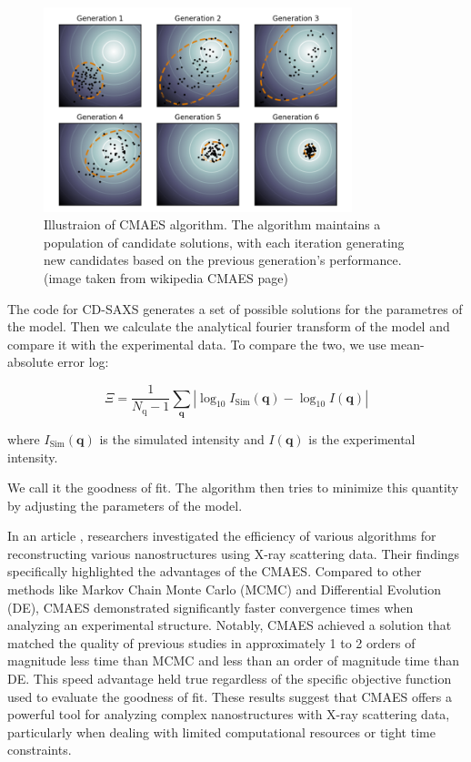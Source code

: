 \begin{figure}[h]
    \centering
    \includegraphics[width=0.8\textwidth]{images/CMAES.png}
    \caption{Illustraion of CMAES algorithm. The algorithm maintains a population of candidate solutions, with each iteration generating new candidates based on the previous generation's performance.(image taken from wikipedia CMAES page) }
    \label{fig:cmaes}
\end{figure}

\FloatBarrier

\medskip

The code for CD-SAXS generates a set of possible solutions for the parametres of the model. Then we calculate the 
analytical fourier transform of the model and compare it with the experimental data. To compare the two,
we use mean-absolute error log:

\medskip

\begin{equation}
    \Xi=\frac{1}{N_{\mathrm{q}}-1} \sum_{\mathbf{q}}\left|\log _{10} I_{\mathrm{Sim}}(\mathbf{q})-\log _{10} I(\mathbf{q})\right|
\end{equation}

\medskip

where $I_{\mathrm{Sim}}(\mathbf{q})$ is the simulated intensity and $I(\mathbf{q})$ is the experimental intensity.

\medskip

We call it the goodness of fit. The algorithm then tries to minimize this quantity by adjusting the parameters of the model.

\medskip

In an article \cite{hannon2016advancing}, researchers investigated the efficiency of various algorithms
for reconstructing various nanostructures using X-ray scattering data.
Their findings specifically highlighted the advantages of the CMAES. Compared to other
methods like Markov Chain Monte Carlo (MCMC) and Differential Evolution 
(DE), CMAES demonstrated significantly faster convergence times when 
analyzing an experimental structure. Notably, CMAES achieved a solution 
that matched the quality of previous studies in approximately 1 to 2 
orders of magnitude less time than MCMC and less than an order of 
magnitude time than DE. This speed advantage held true regardless 
of the specific objective function used to evaluate the goodness of fit. 
These results suggest that CMAES offers a powerful tool for analyzing 
complex nanostructures with X-ray scattering data, particularly when 
dealing with limited computational resources or tight time constraints.

